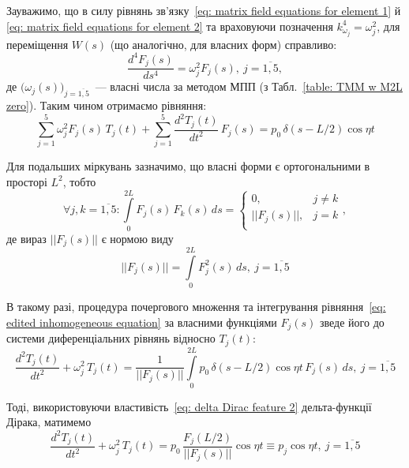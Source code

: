 Зауважимо, що в силу рівнянь зв'язку~\eqref{eq: matrix field equations for element 1} й \eqref{eq: matrix field equations for element 2} та враховуючи позначення $k_{\omega_j}^4=\omega_j^2$, для переміщення $W(s)$ (що аналогічно, для власних форм) справливо:
\begin{equation}\label{eq: F^(4) shorting}
    \frac{d^4 F_j(s)}{d s^4} = \omega_j^2 F_j(s),\ j=\overline{1,5},
\end{equation}
де $\bigl( \omega_j(s) \bigr)_{j=\overline{1,5}}$~--- власні числа за методом МПП (з Табл.~\ref{table: TMM w M2L zero}). Таким чином отримаємо рівняння:
\begin{equation}\label{eq: edited inhomogeneous equation}
    \sum\limits_{j=1}^{5} \omega_j^2 F_j(s)\,T_j(t) + \sum\limits_{j=1}^{5} \frac{d^2 T_j(t)}{d t^2}\,F_j(s) = p_0\,\delta(s-L/2) \cos{\eta t}
\end{equation}

Для подальших міркувань зазначимо, що власні форми є ортогональними в просторі $L^2$, тобто
\begin{equation}
    \forall j,k=\overline{1,5} : \int\limits_{0}^{2L} F_j(s)\,F_k(s)\,ds = 
    \begin{cases}
        0, & j \neq k \\
        ||F_j(s)||, & j = k \\
    \end{cases},
\end{equation}
де вираз $||F_j(s)||$ є нормою виду
\begin{equation}\label{eq: L2 norm}
    ||F_j(s)|| = \int\limits_{0}^{2L} F_j^2(s)\,ds,\ j=\overline{1,5}
\end{equation}

\newpage
В такому разі, процедура почергового множення та інтегрування рівняння~\eqref{eq: edited inhomogeneous equation} за власними функціями $F_j(s)$ зведе його до системи диференціальних рівнянь відносно $T_j(t):$
\begin{equation}\label{eq: searching T(t)}
    \frac{d^2 T_j(t)}{dt^2} + \omega_j^2\,T_j(t) = \frac{1}{||F_j(s)||} \int\limits_{0}^{2L} p_0\,\delta(s-L/2) \cos{\eta t} \, F_j(s)\,ds,\ j=\overline{1,5}
\end{equation}

Тоді, використовуючи властивість~\eqref{eq: delta Dirac feature 2} дельта-функції Дірака, матимемо
\begin{equation}\label{eq: edited searching T(t)}
    \frac{d^2 T_j(t)}{dt^2} + \omega_j^2\,T_j(t) = p_0\,\frac{F_j(L/2)}{||F_j(s)||}\cos{\eta t} \equiv p_j \cos{\eta t},\ j=\overline{1,5}
\end{equation}

